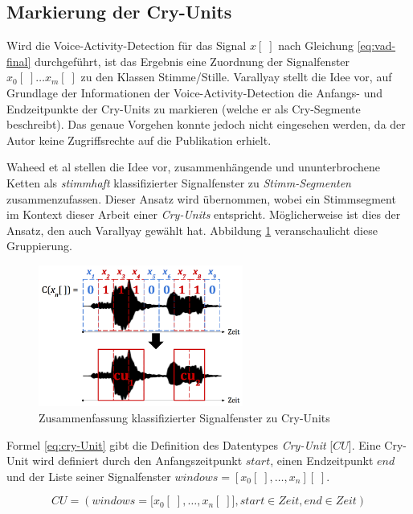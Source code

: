 \subsection{Markierung der Cry-Units}
\label{sec:CryUnit}

Wird die Voice-Activity-Detection für das Signal $x[\;]$ nach Gleichung \ref{eq:vad-final} durchgeführt, ist das Ergebnis eine Zuordnung der Signalfenster $x_0[\;] \ldots x_m[\;]$ zu den Klassen Stimme/Stille. Varallyay \cite[S. 16 - 17]{cry_thesis} stellt die Idee vor, auf Grundlage der Informationen der Voice-Activity-Detection die Anfangs- und Endzeitpunkte der Cry-Units zu markieren (welche er als Cry-Segmente beschreibt). Das genaue Vorgehen konnte jedoch nicht eingesehen werden, da der Autor keine Zugriffsrechte auf die Publikation erhielt.

Waheed et al \cite{vad_entropy} stellen die Idee vor, zusammenhängende und ununterbrochene Ketten als \emph{stimmhaft} klassifizierter Signalfenster zu \emph{Stimm-Segmenten} zusammenzufassen. Dieser Ansatz wird übernommen, wobei ein Stimmsegment im Kontext dieser Arbeit einer \emph{Cry-Units} entspricht. Möglicherweise ist dies der Ansatz, den auch  Varallyay \cite[S. 16 - 17]{cry_thesis} gewählt hat. Abbildung \ref{img:cryUnit} veranschaulicht diese Gruppierung. 

\begin{figure}[h]
	\centering
	\includegraphics[width=0.6\textwidth]{bilder/cry-Unit02.png}
	\caption{Zusammenfassung klassifizierter Signalfenster zu Cry-Units}
	\label{img:cryUnit}
\end{figure}

Formel \ref{eq:cry-Unit} gibt die Definition des Datentypes \emph{Cry-Unit} [$CU$]. Eine Cry-Unit wird definiert durch den Anfangszeitpunkt $start$, einen Endzeitpunkt $end$ und der Liste seiner Signalfenster $windows = [x_0[\;], \ldots, x_n][\;]$.

\begin{equation}
CU = (windows = \big[x_0[\;] ,\ldots, x_n[\;] \big], start \in Zeit, end \in Zeit)
\label{eq:cry-Unit}
\end{equation}

